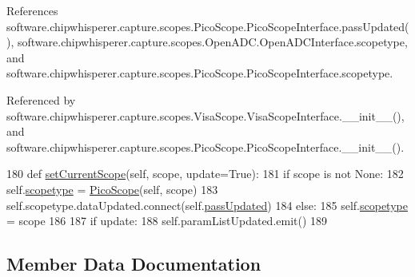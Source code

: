 References software.\+chipwhisperer.\+capture.\+scopes.\+Pico\+Scope.\+Pico\+Scope\+Interface.\+pass\+Updated(), software.\+chipwhisperer.\+capture.\+scopes.\+Open\+A\+D\+C.\+Open\+A\+D\+C\+Interface.\+scopetype, and software.\+chipwhisperer.\+capture.\+scopes.\+Pico\+Scope.\+Pico\+Scope\+Interface.\+scopetype.



Referenced by software.\+chipwhisperer.\+capture.\+scopes.\+Visa\+Scope.\+Visa\+Scope\+Interface.\+\_\+\+\_\+init\+\_\+\+\_\+(), and software.\+chipwhisperer.\+capture.\+scopes.\+Pico\+Scope.\+Pico\+Scope\+Interface.\+\_\+\+\_\+init\+\_\+\+\_\+().


\begin{DoxyCode}
180     \textcolor{keyword}{def }\hyperlink{classsoftware_1_1chipwhisperer_1_1capture_1_1scopes_1_1PicoScope_1_1PicoScopeInterface_a323e934bd546825ab8fc3f8ace3638ee}{setCurrentScope}(self, scope, update=True):
181         \textcolor{keywordflow}{if} scope \textcolor{keywordflow}{is} \textcolor{keywordflow}{not} \textcolor{keywordtype}{None}:
182             self.\hyperlink{classsoftware_1_1chipwhisperer_1_1capture_1_1scopes_1_1PicoScope_1_1PicoScopeInterface_ae87a5f8e59f87a8a19609b2dba4266ee}{scopetype} = \hyperlink{classsoftware_1_1chipwhisperer_1_1capture_1_1scopes_1_1PicoScope_1_1PicoScope}{PicoScope}(self, scope)
183             self.scopetype.dataUpdated.connect(self.\hyperlink{classsoftware_1_1chipwhisperer_1_1capture_1_1scopes_1_1PicoScope_1_1PicoScopeInterface_aaf3513248c10f7a67b84ba6a68af4a51}{passUpdated})
184         \textcolor{keywordflow}{else}:
185             self.\hyperlink{classsoftware_1_1chipwhisperer_1_1capture_1_1scopes_1_1PicoScope_1_1PicoScopeInterface_ae87a5f8e59f87a8a19609b2dba4266ee}{scopetype} = scope
186 
187         \textcolor{keywordflow}{if} update:
188             self.paramListUpdated.emit()
189    
\end{DoxyCode}


\subsection{Member Data Documentation}
\hypertarget{classsoftware_1_1chipwhisperer_1_1capture_1_1scopes_1_1PicoScope_1_1PicoScopeInterface_a9aebcb97eacec83777d81e6d73f78929}{}
